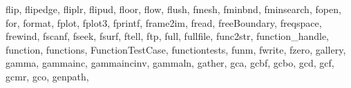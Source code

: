 {{        flip,%
        flipedge,%
        fliplr,%
        flipud,%
        floor,%
        flow,%
        flush,%
        fmesh,%
        fminbnd,%
        fminsearch,%
        fopen,%
        for,%
        format,%
        fplot,%
        fplot3,%
        fprintf,%
        frame2im,%
        fread,%
        freeBoundary,%
        freqspace,%
        frewind,%
        fscanf,%
        fseek,%
        fsurf,%
        ftell,%
        ftp,%
        full,%
        fullfile,%
        func2str,%
        function_handle,%
        function,%
        functions,%
        FunctionTestCase,%
        functiontests,%
        funm,%
        fwrite,%
        fzero,%
        gallery,%
        gamma,%
        gammainc,%
        gammaincinv,%
        gammaln,%
        gather,%
        gca,%
        gcbf,%
        gcbo,%
        gcd,%
        gcf,%
        gcmr,%
        gco,%
        genpath,%
}}

